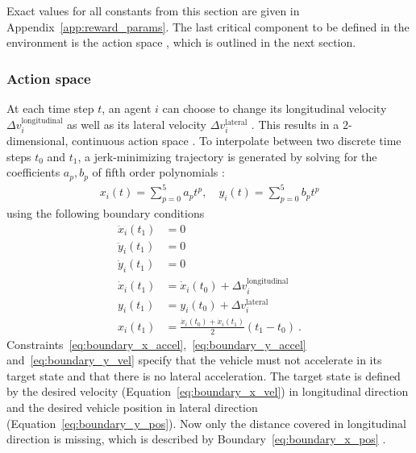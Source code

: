 Exact values for all constants from this section are given in Appendix~\ref{app:reward_params}. The last critical component to be defined in the environment is the action space \actionspace, which is outlined in the next section.

\subsubsection{Action space}\label{sssec:action_space}
At each time step $t$, an agent $i$ can choose to change its longitudinal velocity $\Delta v^{\text{longitudinal}}_i$ as well as its lateral velocity $\Delta v^{\text{lateral}}_i$ \cite{kurzerDecentralizedCooperativePlanning2018}. This results in a $2$-dimensional, continuous action space \actionspace. To interpolate between two discrete time steps $t_0$ and $t_1$, a jerk-minimizing trajectory is generated by solving for the coefficients $a_p, b_p$ of fifth order polynomials \cite{kurzerDecentralizedCooperativePlanning2018}:
\begin{gather}\label{eq:trajectory_planner}
    x_i (t) = \sum_{p = 0}^5 a_p t^p, \quad y_i (t) = \sum_{p = 0}^5 b_p t^p
\end{gather}
using the following boundary conditions
\begin{align}
    \ddot x_i (t_1) & = 0 \label{eq:boundary_x_accel}\\
    \ddot y_i (t_1) & = 0 \label{eq:boundary_y_accel}\\
    \dot y_i (t_1) & = 0 \label{eq:boundary_y_vel}\\
    \dot x_i (t_1) & = \dot x_i (t_0) + \Delta v^{\text{longitudinal}}_i \label{eq:boundary_x_vel}\\
    y_i (t_1) & = y_i (t_0) + \Delta v^{\text{lateral}}_i \label{eq:boundary_y_pos}\\
    x_i (t_1) & = \frac{\dot x_i (t_0) + \dot x_i (t_1)}{2} (t_1 - t_0) \label{eq:boundary_x_pos}~.
\end{align}
Constraints~\ref{eq:boundary_x_accel},~\ref{eq:boundary_y_accel} and~\ref{eq:boundary_y_vel} specify that the vehicle must not accelerate in its target state and that there is no lateral acceleration. The target state is defined by the desired velocity (Equation~\ref{eq:boundary_x_vel}) in longitudinal direction and the desired vehicle position in lateral direction (Equation~\ref{eq:boundary_y_pos}). Now only the distance covered in longitudinal direction is missing, which is described by Boundary~\ref{eq:boundary_x_pos} \cite{kurzerDecentralizedCooperativePlanning2018}.

